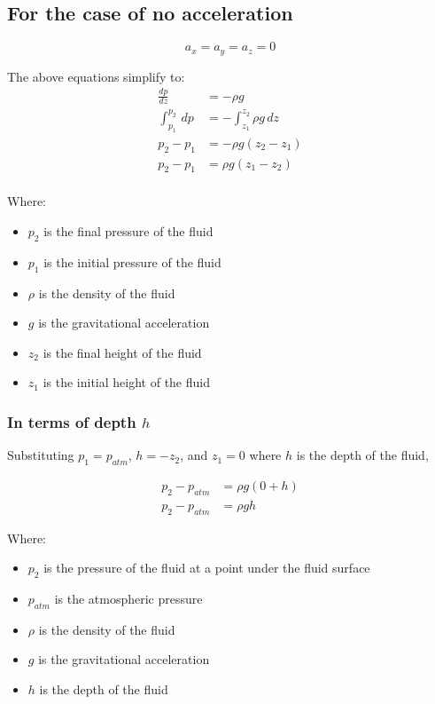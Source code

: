 \documentclass[11pt]{article}
\begin{document}
\subsection{For the case of no acceleration}
\label{sec:org88e3684}
\[a_x = a_y = a_z = 0\]

The above equations simplify to:
\begin{align*}
\frac{dp}{dz} &= - \rho g \\
\int_{p_1}^{p_2} \, dp &= - \int_{z_1}^{z_2} \rho g \, dz \\
p_2 - p_1 &= - \rho g (z_2 - z_1) \\
p_2 - p_1 &= \rho g (z_1 - z_2) \\
\end{align*}

Where:
\begin{itemize}
\item \(p_2\) is the final pressure of the fluid
\item \(p_1\) is the initial pressure of the fluid
\item \(\rho\) is the density of the fluid
\item \(g\) is the gravitational acceleration
\item \(z_2\) is the final height of the fluid
\item \(z_1\) is the initial height of the fluid
\end{itemize}
\subsubsection{In terms of depth \(h\)}
\label{sec:org1b24319}
Substituting \(p_1 = p_{atm}\), \(h = - z_2\), and \(z_1 = 0\) where \(h\) is the depth of the fluid,

\begin{align*}
p_2 - p_{atm} &= \rho g (0 + h) \\
p_2 - p_{atm} &= \rho g h
\end{align*}

Where:
\begin{itemize}
\item \(p_2\) is the pressure of the fluid at a point under the fluid surface
\item \(p_{atm}\) is the atmospheric pressure
\item \(\rho\) is the density of the fluid
\item \(g\) is the gravitational acceleration
\item \(h\) is the depth of the fluid
\end{itemize}
\end{document}

